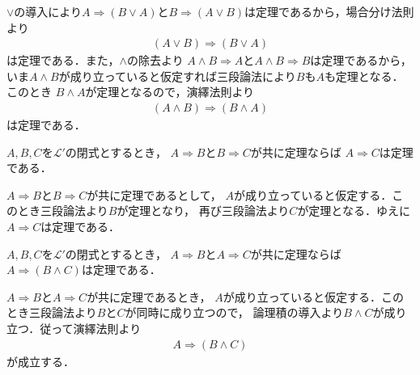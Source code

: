 	\begin{prf}
		$\vee$の導入により$A \Longrightarrow (B \vee A)$と$B \Longrightarrow (A \vee B)$は定理であるから，場合分け法則より
		\begin{align}
			(A \vee B) \Longrightarrow (B \vee A)
		\end{align}
		は定理である．また，$\wedge$の除去より
		$A \wedge B \Longrightarrow A$と$A \wedge B \Longrightarrow B$は定理であるから，
		いま$A \wedge B$が成り立っていると仮定すれば三段論法により$B$も$A$も定理となる．このとき
		$B \wedge A$が定理となるので，演繹法則より
		\begin{align}
			(A \wedge B) \Longrightarrow (B \wedge A)
		\end{align}
		は定理である．
		\QED
	\end{prf}
	
	\begin{screen}
		\begin{metathm}[含意の推移律]\label{metathm:transitive_law_of_implication}
			$A,B,C$を$\mathcal{L}'$の閉式とするとき，
			$A \Longrightarrow B$と$B \Longrightarrow C$が共に定理ならば
			$A \Longrightarrow C$は定理である．
		\end{metathm}
	\end{screen}
	
	\begin{prf}
		$A \Longrightarrow B$と$B \Longrightarrow C$が共に定理であるとして，
		$A$が成り立っていると仮定する．このとき三段論法より$B$が定理となり，
		再び三段論法より$C$が定理となる．ゆえに$A \Longrightarrow C$は定理である．
		\QED
	\end{prf}
	
	\begin{screen}
		\begin{metathm}[二式が同時に導かれるならその論理積が導かれる]
		\label{metathm:conjunction_of_consequences}
			$A,B,C$を$\mathcal{L}'$の閉式とするとき，
			$A \Longrightarrow B$と$A \Longrightarrow C$が共に定理ならば
			$A \Longrightarrow (B \wedge C)$は定理である．
		\end{metathm}
	\end{screen}
	
	\begin{prf}
		$A \Longrightarrow B$と$A \Longrightarrow C$が共に定理であるとき，
		$A$が成り立っていると仮定する．このとき三段論法より$B$と$C$が同時に成り立つので，
		論理積の導入より$B \wedge C$が成り立つ．従って演繹法則より
		\begin{align}
			A \Longrightarrow (B \wedge C)
		\end{align}
		が成立する．
		\QED
	\end{prf}
	
